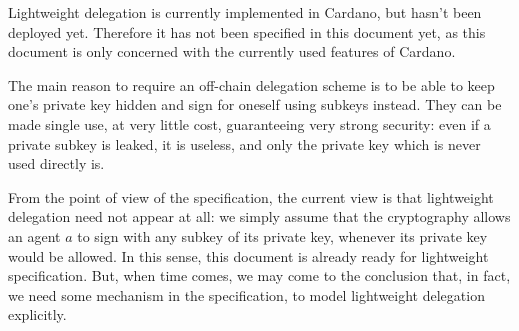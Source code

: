 \documentclass{article}
\begin{document}
Lightweight delegation is currently implemented in Cardano, but hasn't
been deployed yet. Therefore it has not been specified in this
document yet, as this document is only concerned with the currently
used features of Cardano.

The main reason to require an off-chain delegation scheme is to be
able to keep one's private key hidden and sign for oneself using
subkeys instead. They can be made single use, at very little cost,
guaranteeing very strong security: even if a private subkey is leaked,
it is useless, and only the private key which is never used directly
is.

From the point of view of the specification, the current view is that
lightweight delegation need not appear at all: we simply assume that
the cryptography allows an agent $a$ to sign with any subkey of its
private key, whenever its private key would be allowed. In this sense,
this document is already ready for lightweight specification. But,
when time comes, we may come to the conclusion that, in fact, we need
some mechanism in the specification, to model lightweight delegation
explicitly.
\end{document}
